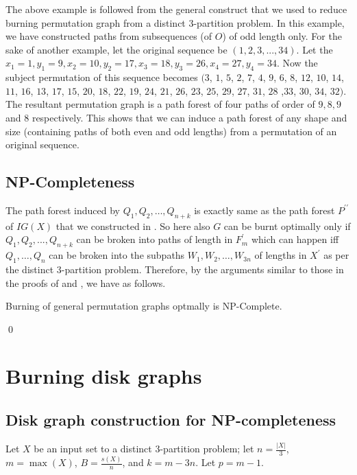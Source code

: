 The above example is followed from the general construct that we used to reduce burning permutation graph from a distinct 3-partition problem. In this example, we have constructed paths from subsequences (of $O$) of odd length only. For the sake of another example, let the original sequence be $(1,2,3,...,34).$ Let the $x_1=1, y_1=9, x_2=10, y_2=17, x_3=18, y_3=26, x_4=27, y_4=34$. Now the subject permutation of this sequence becomes $(3$, $1$, $5$, $2$, $7$, $4$, $9$, $6$, $8$, $12$, $10$, $14$, $11$, $16$, $13$, $17$, $15$, $20$, $18$, $22$, $19$, $24$, $21$, $26$, $23$, $25$, $29$, $27$, $31$, $28$ ,$33$, $30$, $34$, $32)$. The resultant permutation graph is a path forest of four paths of order of $9,8,9$ and $8$ respectively.
This shows that we can induce a path forest of any shape and size (containing paths of both even and odd lengths) from a permutation of an original sequence.

\subsection{NP-Completeness}

The path forest induced by $Q_1,Q_2,\dots,Q_{n+k}$ is exactly same as the path forest $P^{\prime\prime}$ of $IG(X)$ that we constructed in . So here also $G$ can be burnt optimally only if $Q_1, Q_2, ..., Q_{n+k}$ can be broken into paths of length in $F^\prime_m$ which can happen iff $Q_1,\dots,Q_n$ can be broken into the subpaths $W_1,W_2,\dots,W_{3n}$ of lengths in $X^\prime$ as per the distinct 3-partition problem. Therefore, by the arguments similar to those in the proofs of  and , we have  as follows.

\begin{theorem}\label{theorem:BPGNPC}
    Burning of general permutation graphs optmally is NP-Complete.
\end{theorem}\qed

\section{Burning disk graphs}\label{section:burn-disk-graphs}

\subsection{Disk graph construction for NP-completeness}

Let $X$ be an input set to a distinct 3-partition problem; let $n=\frac{|X|}{3}$, $m = \max (X)$, $B = \frac{s(X)}{n}$, and $k=m-3n$. Let $p=m-1$.

